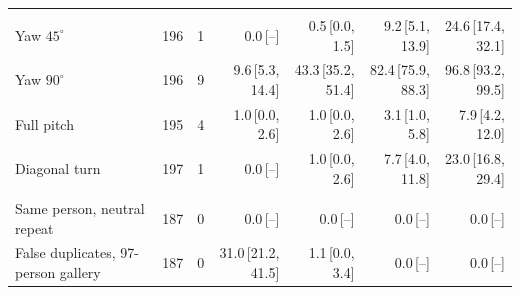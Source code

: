 \begin{table}[t]
\begin{tabular}{@{}>{\raggedright\arraybackslash}p{3.8cm}rrrrrr@{}}
\addlinespace[2pt]
\multicolumn{7}{@{}l}{\textit{Larger rotations outside that grouping}} \\
Yaw $45^\circ$ & 196 & 1 & 0.0\,[--] & 0.5\,[0.0, 1.5] & 9.2\,[5.1, 13.9] & 24.6\,[17.4, 32.1] \\
Yaw $90^\circ$ & 196 & 9 & 9.6\,[5.3, 14.4] & 43.3\,[35.2, 51.4] & 82.4\,[75.9, 88.3] & 96.8\,[93.2, 99.5] \\
Full pitch & 195 & 4 & 1.0\,[0.0, 2.6] & 1.0\,[0.0, 2.6] & 3.1\,[1.0, 5.8] & 7.9\,[4.2, 12.0] \\
Diagonal turn & 197 & 1 & 0.0\,[--] & 1.0\,[0.0, 2.6] & 7.7\,[4.0, 11.8] & 23.0\,[16.8, 29.4] \\
\addlinespace[2pt]
\multicolumn{7}{@{}l}{\textit{Controls}} \\
Same person, neutral repeat & 187 & 0 & 0.0\,[--] & 0.0\,[--] & 0.0\,[--] & 0.0\,[--] \\
False duplicates, 97-person gallery & 187 & 0 & 31.0\,[21.2, 41.5] & 1.1\,[0.0, 3.4] & 0.0\,[--] & 0.0\,[--]\\
\bottomrule
\end{tabular}
\endgroup
\end{table}

